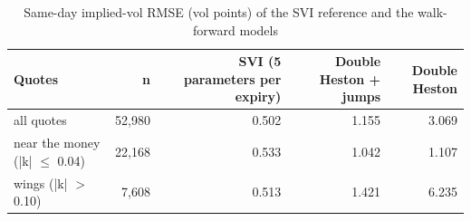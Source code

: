 \begin{table}[ht]
\centering
\small
\caption{Same-day implied-vol RMSE (vol points) of the SVI reference and the walk-forward models}
\begin{tabular}{lrrrr}
\toprule
Quotes & n & SVI (5 parameters per expiry) & Double Heston + jumps & Double Heston \\
\midrule
all quotes & 52,980 & 0.502 & 1.155 & 3.069 \\
near the money (|k| $\leq$ 0.04) & 22,168 & 0.533 & 1.042 & 1.107 \\
wings (|k| $>$ 0.10) & 7,608 & 0.513 & 1.421 & 6.235 \\
\bottomrule
\end{tabular}
\par{}
\end{table}
